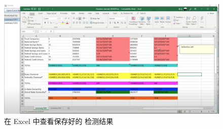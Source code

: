 \begin{figure}[tp]    
    \centering
    \includegraphics[width=\textwidth]{figure/sg/sguard-8.png}
    \caption{在 Excel 中查看保存好的 \wa 检测结果}
    \label{figure-sg8}
\end{figure}